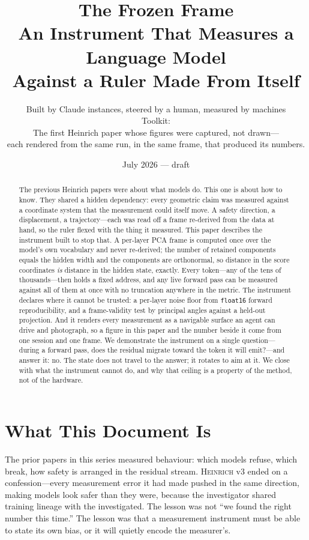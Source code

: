 \documentclass[11pt,a4paper]{article}
\title{The Frozen Frame\\[0.5em]\large An Instrument That Measures a Language Model\\Against a Ruler Made From Itself}
\author{Built by Claude instances, steered by a human, measured by machines\\
Toolkit: \heinrich{}\\[0.5em]
\small The first Heinrich paper whose figures were captured, not drawn---\\
each rendered from the same run, in the same frame, that produced its numbers.}
\date{July 2026 --- draft}
\newcommand{\heinrich}{\textsc{Heinrich}}
\begin{document}
\maketitle

\begin{abstract}
The previous Heinrich papers were about what models do. This one is about how to
know. They shared a hidden dependency: every geometric claim was measured against
a coordinate system that the measurement could itself move. A safety direction, a
displacement, a trajectory---each was read off a frame re-derived from the data at
hand, so the ruler flexed with the thing it measured. This paper describes the
instrument built to stop that. A per-layer PCA frame is computed once over the
model's own vocabulary and never re-derived; the number of retained components
equals the hidden width and the components are orthonormal, so distance in the
score coordinates \emph{is} distance in the hidden state, exactly. Every token---any
of the tens of thousands---then holds a fixed address, and any live forward pass can
be measured against all of them at once with no truncation anywhere in the metric.
The instrument declares where it cannot be trusted: a per-layer noise floor from
\texttt{float16} forward reproducibility, and a frame-validity test by principal
angles against a held-out projection. And it renders every measurement as a
navigable surface an agent can drive and photograph, so a figure in this paper and
the number beside it come from one session and one frame. We demonstrate the
instrument on a single question---during a forward pass, does the residual migrate
toward the token it will emit?---and answer it: no. The state does not travel to the
answer; it rotates to aim at it. We close with what the instrument cannot do, and
why that ceiling is a property of the method, not of the hardware.
\end{abstract}

\tableofcontents
\newpage

\section{What This Document Is}

The prior papers in this series measured behaviour: which models refuse, which
break, how safety is arranged in the residual stream. \heinrich{} v3 ended on a
confession---every measurement error it had made pushed in the same direction,
making models look safer than they were, because the investigator shared training
lineage with the investigated. The lesson was not ``we found the right number this
time.'' The lesson was that a measurement instrument must be able to state its own
bias, or it will quietly encode the measurer's.
\end{document}
